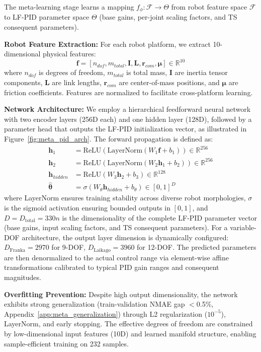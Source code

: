 \documentclass[DTMColor]{ROB-New}
\begin{document}
The meta-learning stage learns a mapping $f_{\phi}: \mathcal{F} \rightarrow \Theta$ from robot feature space $\mathcal{F}$ to LF-PID parameter space $\Theta$ (base gains, per-joint scaling factors, and TS consequent parameters). 

\textbf{Robot Feature Extraction:} For each robot platform, we extract 10-dimensional physical features:
\begin{equation}
    \mathbf{f} = [n_{dof}, m_{total}, \mathbf{I}, \mathbf{L}, \mathbf{r}_{com}, \bm{\mu}] \in \mathbb{R}^{10}
\end{equation}
where $n_{dof}$ is degrees of freedom, $m_{total}$ is total mass, $\mathbf{I}$ are inertia tensor components, $\mathbf{L}$ are link lengths, $\mathbf{r}_{com}$ are center-of-mass positions, and $\bm{\mu}$ are friction coefficients. Features are normalized to facilitate cross-platform learning.

    \textbf{Network Architecture:} We employ a hierarchical feedforward neural network with two encoder layers (256D each) and one hidden layer (128D), followed by a parameter head that outputs the LF-PID initialization vector, as illustrated in Figure~\ref{fig:meta_pid_arch}. The forward propagation is defined as:
\begin{align}
    \mathbf{h}_1 &= \text{ReLU}(\text{LayerNorm}(W_1 \mathbf{f} + b_1)) \in \mathbb{R}^{256} \\
    \mathbf{h}_2 &= \text{ReLU}(\text{LayerNorm}(W_2 \mathbf{h}_1 + b_2)) \in \mathbb{R}^{256} \\
    \mathbf{h}_{hidden} &= \text{ReLU}(W_3 \mathbf{h}_2 + b_3) \in \mathbb{R}^{128} \\
    \hat{\bm{\theta}} &= \sigma(W_{\theta} \mathbf{h}_{hidden} + b_{\theta}) \in [0,1]^{D}
\end{align}
where LayerNorm ensures training stability across diverse robot morphologies, $\sigma$ is the sigmoid activation ensuring bounded outputs in $[0,1]$, and $D = D_{\text{total}} = 330n$ is the dimensionality of the complete LF-PID parameter vector (base gains, input scaling factors, and TS consequent parameters). For a variable-DOF architecture, the output layer dimension is dynamically configured: $D_{\text{Franka}} = 2970$ for 9-DOF, $D_{\text{Laikago}} = 3960$ for 12-DOF. The predicted parameters are then denormalized to the actual control range via element-wise affine transformations calibrated to typical PID gain ranges and consequent magnitudes.

\textbf{Overfitting Prevention:} Despite high output dimensionality, the network exhibits strong generalization (train-validation NMAE gap $<$0.5\%, Appendix~\ref{app:meta_generalization}) through L2 regularization ($10^{-5}$), LayerNorm, and early stopping. The effective degrees of freedom are constrained by low-dimensional input features (10D) and learned manifold structure, enabling sample-efficient training on 232 samples.
\end{document}
